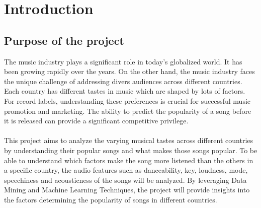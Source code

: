 \chapter{Introduction}

\section{Purpose of the project}
The music industry plays a significant role in today’s globalized world.
It has been growing rapidly over the years. On the other hand, the music
industry faces the unique challenge of addressing divers audiences across
different countries. Each country has different tastes in music which are shaped
by lots of factors. For record labels, understanding these preferences is
crucial for successful music promotion and marketing. The ability to predict
the popularity of a song before it is released can provide a significant 
competitive privilege.\\
\\
This project aims to analyze the varying musical tastes across different countries by 
understanding their popular songs and what makes those songs popular. To be able to understand
which factors make the song more listened than the others in a specific country, the audio features 
such as danceability, key, loudness, mode, speechiness and acousticness of the songs will be analyzed.
By leveraging Data Mining and Machine Learning Techniques, the project will provide insights into
the factors determining the popularity of songs in different countries.\\


